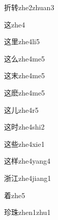 \begin{verbete}[7;8]{折转}{zhe2zhuan3}
\end{verbete}

\begin{verbete}[7]{这}{zhe4}
\end{verbete}

\begin{verbete}[7;7]{这里}{zhe4li5}
\end{verbete}

\begin{verbete}[7;3]{这么}{zhe4me5}
\end{verbete}

\begin{verbete}[7;5]{这末}{zhe4me5}
\end{verbete}

\begin{verbete}[7;14]{这麽}{zhe4me5}
\end{verbete}

\begin{verbete}[7;2]{这儿}{zhe4r5}
\end{verbete}

\begin{verbete}[7;7]{这时}{zhe4shi2}
\end{verbete}

\begin{verbete}[7;8]{这些}{zhe4xie1}
\end{verbete}

\begin{verbete}[7;10]{这样}{zhe4yang4}
\end{verbete}

\begin{verbete*}[10;6]{浙江}{zhe4jiang1}
\end{verbete*}

\begin{verbete}[11]{着}{zhe5}
\end{verbete}

\begin{verbete}[10;10]{珍珠}{zhen1zhu1}
\end{verbete}

